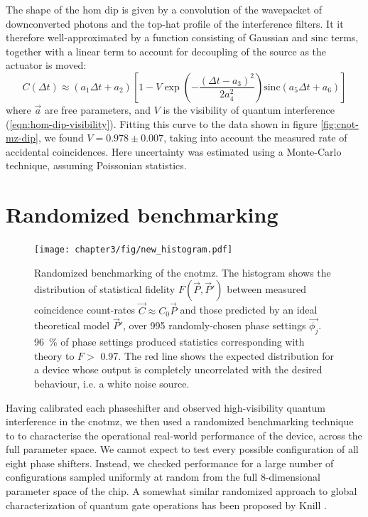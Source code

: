 The shape of the \gls{hom} dip is given by a convolution of the wavepacket of downconverted photons and the top-hat profile of the interference filters. It it therefore well-approximated by a function consisting of Gaussian and $\mathrm{sinc}$ terms, together with a linear term to account for decoupling of the source as the actuator is moved:
\newcommand{\dlt}{\Delta t}
\begin{equation}
   C(\Delta t) \approx 
   (a_1  \dlt + a_2)
    \left[
    1-V
    \exp\left(-\frac{(\dlt-a_3)^2}{2a_4^2}\right) \mathrm{sinc}\left( a_5\dlt + a_6 \right)
    \right]
    \label{eqn:dip-fit}
\end{equation}
where $\vec{a}$ are free parameters, and $V$ is the visibility of quantum interference (\ref{eqn:hom-dip-visibility}).  
Fitting this curve to the data shown in figure \ref{fig:cnot-mz-dip}, we found $V=0.978\pm0.007$, taking into account the measured rate of accidental coincidences. Here uncertainty was estimated using a Monte-Carlo technique, assuming Poissonian statistics.

\section{Randomized benchmarking}
\label{sec:cnotmz-randomized-benchmarking}
\begin{figure}[t]
\centering
\texttt{[image: chapter3/fig/new\_histogram.pdf]}
\caption[Randomized benchmarking]
{
Randomized benchmarking of the \gls{cnotmz}. 
The histogram shows the distribution of statistical fidelity $F(\vec{P}, \vec{P}')$ between measured coincidence count-rates $\vec{C} \approx C_0 \vec{P}$ and those predicted by an ideal theoretical model $\vec{P}'$, over 995 randomly-chosen phase settings 
$\vec{\phi_{j}}$. 
\SI{96}{\percent} of phase settings produced statistics corresponding with theory to $F >$ 0.97. The red line shows the expected distribution for a device whose output is completely uncorrelated with the desired behaviour, i.e. a white noise source.}
\label{fig:histogram}
\end{figure}

Having calibrated each phaseshifter and observed high-visibility quantum interference in the \gls{cnotmz}, we then used a randomized benchmarking technique to to characterise the operational real-world performance of the device, across the full parameter space.
We cannot expect to test every possible configuration of all eight phase shifters. Instead, we checked performance for a large number of configurations sampled uniformly at random from the full 8-dimensional parameter space of the chip. A somewhat similar randomized approach to global characterization of quantum gate operations has been proposed by Knill \cite{Knill2008}.

